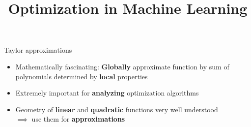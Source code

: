 \documentclass[11pt,compress,t,notes=noshow, xcolor=table]{beamer}
\title{Optimization in Machine Learning}
\date{}
\begin{document}
\sloppy


\begin{vbframe}{Taylor approximations}

\begin{itemize}
    \item Mathematically fascinating: \textbf{Globally} approximate function by sum of polynomials determined by \textbf{local} properties
    \item Extremely important for \textbf{analyzing} optimization algorithms
    \item Geometry of \textbf{linear} and \textbf{quadratic} functions very well understood \\ $\implies$ use them for \textbf{approximations}
\end{itemize}


\end{vbframe}
\end{document}
